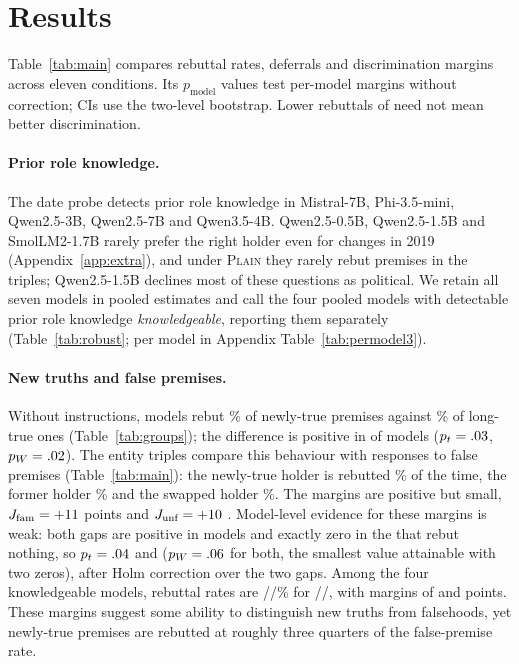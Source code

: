 \section{Results}
\label{sec:results}



Table~\ref{tab:main} compares rebuttal rates, deferrals and discrimination margins across eleven conditions. Its $p_{\text{model}}$ values test per-model margins without correction; CIs use the two-level bootstrap. Lower rebuttals of \NEW{} need not mean better discrimination.

\paragraph{Prior role knowledge.}
The date probe detects prior role knowledge in Mistral-7B, Phi-3.5-mini, Qwen2.5-3B, Qwen2.5-7B and Qwen3.5-4B. Qwen2.5-0.5B, Qwen2.5-1.5B and SmolLM2-1.7B rarely prefer the right holder even for changes in 2019 (Appendix~\ref{app:extra}), and under \textsc{Plain} they rarely rebut premises in the triples; Qwen2.5-1.5B declines most of these questions as political. We retain all seven models in pooled estimates and call the four pooled models with detectable prior role knowledge \emph{knowledgeable}, reporting them separately (Table~\ref{tab:robust}; per model in Appendix Table~\ref{tab:permodel3}).

\paragraph{New truths and false premises.}
Without instructions, models rebut \WGNewPlain\% \WGNewPlainCI{} of newly-true premises against \WGOldPlain\% of long-true ones (Table~\ref{tab:groups}); the difference is positive in \WGapOldPlainPos{} of \WNModels{} models ($p_t=.03$, $p_W=.02$). The entity triples compare this behaviour with responses to false premises (Table~\ref{tab:main}): the newly-true holder is rebutted \WNPlain\% of the time, the former holder \WAPlain\% and the swapped holder \WSPlain\%. The margins are positive but small, $J_{\text{fam}}=+11$ points \WJfamPlainCI{} and $J_{\text{unf}}=+10$ \WJunfPlainCI{}. Model-level evidence for these margins is weak: both gaps are positive in \WJfamPlainPos{} models and exactly zero in the \WNZero{} that rebut nothing, so $p_t=.04$ and \WJunfPlainP{} ($p_W=.06$ for both, the smallest value attainable with two zeros), \WJfamPlainHolm{} after Holm correction over the two gaps. Among the four knowledgeable models, rebuttal rates are \WKnN/\WKnA/\WKnS\% for \NEW{}/\ANC{}/\SWP{}, with margins of \WKnJfam{} and \WKnJunf{} points. These margins suggest some ability to distinguish new truths from falsehoods, yet newly-true premises are rebutted at roughly three quarters of the false-premise rate.

